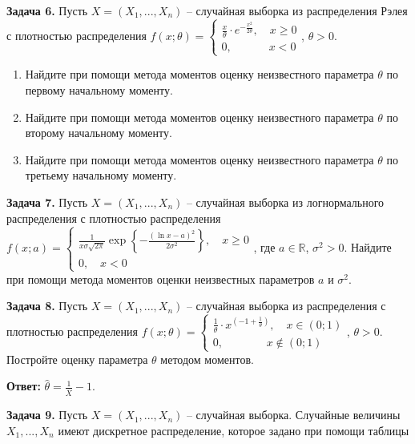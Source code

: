 \textbf{Задача 6.} Пусть $X=\left(X_{1} ,...,X_{n} \right)$ -- случайная выборка из распределения Рэлея с плотностью распределения $f\left(x;\theta \right)=\left\{\begin{array}{l} {{\tfrac{x}{\theta }} \cdot e^{-{\tfrac{x^{2} }{2\theta }} } ,\quad x\ge 0} \\ {0,\quad \quad \quad \; x<0} \end{array}\right. $, $\theta >0$. 

\begin{enumerate}
\item  Найдите при помощи метода моментов оценку неизвестного параметра $\theta $ по первому начальному моменту.

\item  Найдите при помощи метода моментов оценку неизвестного параметра $\theta $ по второму начальному моменту.

\item  Найдите при помощи метода моментов оценку неизвестного параметра $\theta $ по третьему начальному моменту.
\end{enumerate}



\textbf{Задача 7.} Пусть $X=\left(X_{1} ,...,X_{n} \right)$ -- случайная выборка из логнормального распределения с плотностью распределения $f\left(x;a\right)=\left\{\begin{array}{l} {\frac{1}{x\sigma \sqrt{2\pi } } \exp \left\{-\frac{\left(\ln x-a\right)^{2} }{2\sigma ^{2} } \right\},\quad x\ge 0} \\ {0,\quad x<0} \end{array}\right. $, где $a\in {\mathbb R}$, $\sigma ^{2} >0$. Найдите при помощи метода моментов оценки неизвестных параметров $a$ и $\sigma ^{2} $.



\textbf{Задача 8.} Пусть $X=\left(X_{1} ,...,X_{n} \right)$ -- случайная выборка из распределения с плотностью распределения $f\left(x;\theta \right)=\left\{\begin{array}{l} {{\tfrac{1}{\theta }} \cdot x^{\left(-1+{\tfrac{1}{\theta }} \right)} ,\quad x\in \left(0;1\right)} \\ {0,\quad \quad \quad \; \; \; x\notin \left(0;1\right)} \end{array}\right. $, $\theta >0$. Постройте оценку параметра $\theta $ методом моментов.

\textbf{Ответ: }$\widehat{\theta }=\frac{1}{\overline{X}} -1$.

\textbf{Задача 9.} Пусть $X=\left(X_{1} ,...,X_{n} \right)$ -- случайная выборка. Случайные величины $X_{1} ,...,X_{n} $ имеют дискретное распределение, которое задано при помощи таблицы

